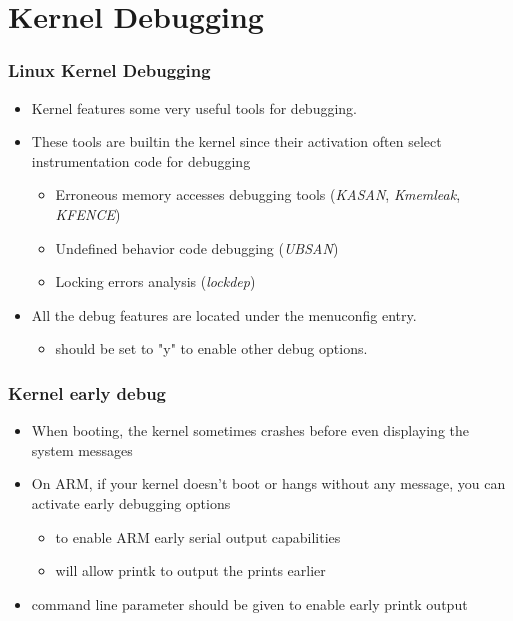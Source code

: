 \section{Kernel Debugging}

\begin{frame}
  \frametitle{Linux Kernel Debugging}
  \begin{itemize}
    \item Kernel features some very useful tools for debugging.
    \item These tools are builtin the kernel since their activation often select instrumentation code for debugging
    \begin{itemize}
      \item Erroneous memory accesses debugging tools ({\em KASAN}, {\em Kmemleak}, {\em KFENCE})
      \item Undefined behavior code debugging ({\em UBSAN})
      \item Locking errors analysis ({\em lockdep})
    \end{itemize}
    \item All the debug features are located under the  menuconfig entry.
    \begin{itemize}
    \item {} should be set to "y" to enable other
          debug options.
    \end{itemize}
  \end{itemize}
\end{frame}



\begin{frame}
  \frametitle{Kernel early debug}
  \begin{itemize}
  \item When booting, the kernel sometimes crashes before even displaying
    the system messages
  \item On ARM, if your kernel doesn't boot or hangs without any
    message, you can activate early debugging options
  \begin{itemize}
    \item {} to enable ARM early serial output
      capabilities
    \item {} will allow printk to output the
      prints earlier
  \end{itemize}
  \item {} command line parameter should be given to enable
    early printk output
  \end{itemize}
\end{frame}

